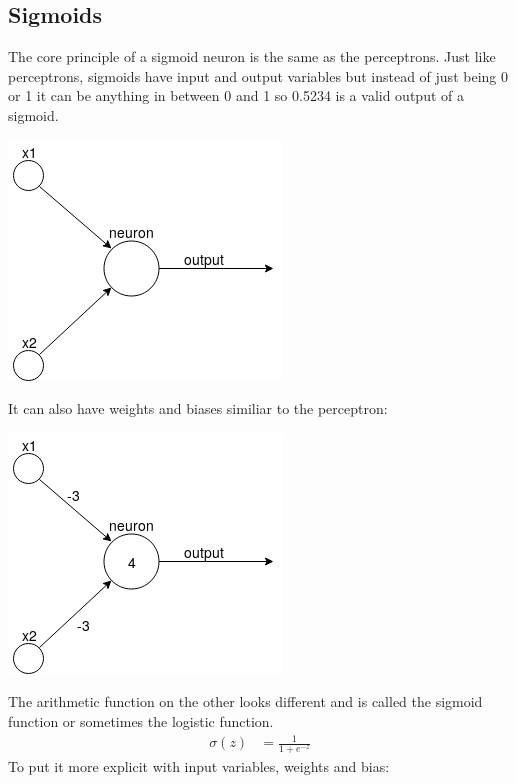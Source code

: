 \subsection{Sigmoids}
The core principle of a sigmoid neuron is the same as the perceptrons. Just like perceptrons, sigmoids have input and output variables but
instead of just being 0 or 1 it can be anything in between 0 and 1 so 0.5234 is a valid output of a sigmoid.
\begin{center}
    \includegraphics[scale=0.5]{images/neurons/simple_neuron.png}
\end{center}
It can also have weights and biases similiar to the perceptron:
\begin{center}
    \includegraphics[scale=0.5]{images/neurons/simple_neuron_bias.png}
\end{center}
The arithmetic function on the other looks different and is called the sigmoid function or sometimes the logistic function.
\vspace{0.5cm}
\begin{equation*}
    \begin{split}
        \sigma(z) & = \frac{1}{1+e^{-z}}
    \end{split}
\end{equation*}
\vspace{0.5cm}
To put it more explicit with input variables, weights and bias:
